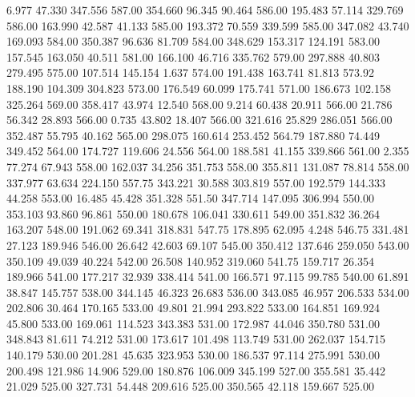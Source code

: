    6.977   47.330  347.556       587.00
 354.660   96.345   90.464       586.00
 195.483   57.114  329.769       586.00
 163.990   42.587   41.133       585.00
 193.372   70.559  339.599       585.00
 347.082   43.740  169.093       584.00
 350.387   96.636   81.709       584.00
 348.629  153.317  124.191       583.00
 157.545  163.050   40.511       581.00
 166.100   46.716  335.762       579.00
 297.888   40.803  279.495       575.00
 107.514  145.154    1.637       574.00
 191.438  163.741   81.813       573.92
 188.190  104.309  304.823       573.00
 176.549   60.099  175.741       571.00
 186.673  102.158  325.264       569.00
 358.417   43.974   12.540       568.00
   9.214   60.438   20.911       566.00
  21.786   56.342   28.893       566.00
   0.735   43.802   18.407       566.00
 321.616   25.829  286.051       566.00
 352.487   55.795   40.162       565.00
 298.075  160.614  253.452       564.79
 187.880   74.449  349.452       564.00
 174.727  119.606   24.556       564.00
 188.581   41.155  339.866       561.00
   2.355   77.274   67.943       558.00
 162.037   34.256  351.753       558.00
 355.811  131.087   78.814       558.00
 337.977   63.634  224.150       557.75
 343.221   30.588  303.819       557.00
 192.579  144.333   44.258       553.00
  16.485   45.428  351.328       551.50
 347.714  147.095  306.994       550.00
 353.103   93.860   96.861       550.00
 180.678  106.041  330.611       549.00
 351.832   36.264  163.207       548.00
 191.062   69.341  318.831       547.75
 178.895   62.095    4.248       546.75
 331.481   27.123  189.946       546.00
  26.642   42.603   69.107       545.00
 350.412  137.646  259.050       543.00
 350.109   49.039   40.224       542.00
  26.508  140.952  319.060       541.75
 159.717   26.354  189.966       541.00
 177.217   32.939  338.414       541.00
 166.571   97.115   99.785       540.00
  61.891   38.847  145.757       538.00
 344.145   46.323   26.683       536.00
 343.085   46.957  206.533       534.00
 202.806   30.464  170.165       533.00
  49.801   21.994  293.822       533.00
 164.851  169.924   45.800       533.00
 169.061  114.523  343.383       531.00
 172.987   44.046  350.780       531.00
 348.843   81.611   74.212       531.00
 173.617  101.498  113.749       531.00
 262.037  154.715  140.179       530.00
 201.281   45.635  323.953       530.00
 186.537   97.114  275.991       530.00
 200.498  121.986   14.906       529.00
 180.876  106.009  345.199       527.00
 355.581   35.442   21.029       525.00
 327.731   54.448  209.616       525.00
 350.565   42.118  159.667       525.00
